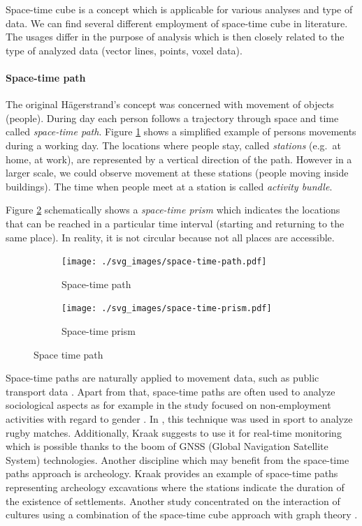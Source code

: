\documentclass[a4paper,12pt,oneside]{book}
\begin{document}
Space-time cube is a concept which is applicable for various analyses and type of data.
We can find several different employment of space-time cube in literature.
The usages differ in the purpose of analysis which is then closely related
to the type of analyzed data (vector lines, points, voxel data).

\paragraph{Space-time path}
The original Hägerstrand's concept was concerned with movement of objects (people).
During day each person follows a trajectory through space and time called
\emph{space-time path}. Figure \ref{fig:st-path} shows a simplified example
of persons movements during a working day. The locations where people stay,
called \emph{stations} (e.g.\ at home, at work), are represented by a vertical direction of the path.
However in a larger scale, we could observe movement at these stations
(people moving inside buildings). The time when people meet at a station is called \emph{activity bundle}.

Figure \ref{fig:st-prism} schematically shows a \emph{space-time prism}
which indicates the locations that can be reached in a particular time interval
(starting and returning to the same place). In reality, it is not circular because
not all places are accessible.




\begin{figure}[ht]
\centering
    \begin{subfigure}[ht]{0.49\textwidth}
    \centering
        \texttt{[image: ./svg\_images/space-time-path.pdf]}
    \caption{Space-time path}
    \label{fig:st-path}
    \end{subfigure}
    \begin{subfigure}[ht]{0.49\textwidth}
    \centering
        \texttt{[image: ./svg\_images/space-time-prism.pdf]}
    \caption{Space-time prism}
    \label{fig:st-prism}
    \end{subfigure}
\caption{Space time path}
\label{fig:st-path-prism}
\end{figure}


Space-time paths are naturally applied to movement data, such as public transport data \cite{transport2005visualisation}.
Apart from that, space-time paths are often used to analyze sociological aspects
as for example in the study focused on non-employment activities with regard to gender \cite{kwan1999gender}.
In \cite{moore2003time}, this technique was used in sport to analyze rugby matches.
Additionally, Kraak \cite{kraak2005visualization} suggests to use it for real-time monitoring which is possible thanks to
the boom of GNSS (Global Navigation Satellite System) technologies.
Another discipline which may benefit from the space-time paths approach is archeology.
Kraak \cite{kraak2005visualization} provides an example of space-time paths representing
archeology excavations where the stations indicate the duration of the existence of settlements.
Another study concentrated on the interaction of cultures using a combination of the space-time cube approach
with graph theory \cite{huisman2008development}.
\end{document}
